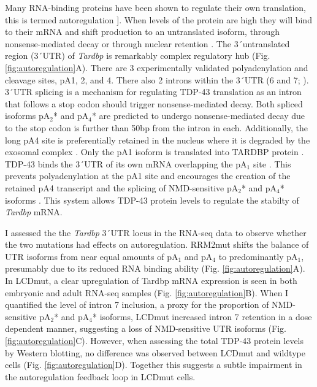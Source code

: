 Many RNA-binding proteins have been shown to regulate their own translation, this is termed autoregulation \citep{Lareau2007,Wollerton2004}]. 
When levels of the protein are high they will bind to their mRNA and shift production to an untranslated isoform, through nonsense-mediated decay or through nuclear retention \citep{McGlincy2008-wh,Boutz2015}.
The 3\'\ untranslated region (3\'\ UTR) of \textit{Tardbp} is remarkably complex regulatory hub (Fig. \ref{fig:autoregulation}A). 
There are 3 experimentally validated polyadenylation and cleavage sites, pA1, 2, and 4. 
There also 2 introns within the 3\'\ UTR (6 and 7; \citep{Ayala2011,Koyama2016}). 
3\'\ UTR splicing is a mechanism for regulating TDP-43 translation as an intron that follows a stop codon should trigger nonsense-mediated decay. 
Both spliced isoforms pA$_2$* and pA$_4$* are predicted to undergo nonsense-mediated decay due to the stop codon is further than 50bp from the intron in each.
Additionally, the long pA4 site is preferentially retained in the nucleus where it is degraded by the exosomal complex \citep{Ayala2011}.
Only the pA1 isoform is translated into TARDBP protein \citep{Koyama2016}.
TDP-43 binds the 3\'\ UTR of its own mRNA overlapping the pA$_1$ site  \citep{Polymenidou2011,Tollervey2011}.
This prevents polyadenylation at the pA1 site and encourages the creation of the retained pA4 transcript and the splicing of NMD-sensitive pA$_2$* and pA$_4$* isoforms \citep{Koyama2016}. 
This system allows TDP-43 protein levels to regulate the stabilty of \textit{Tardbp} mRNA.

I assessed the the \textit{Tardbp} 3\'\ UTR locus in the RNA-seq data to observe whether the two mutations had effects on autoregulation. 
RRM2mut shifts the balance of UTR isoforms from near equal amounts of pA$_1$ and pA$_4$ to predominantly pA$_1$, presumably due to its reduced RNA binding ability  (Fig. \ref{fig:autoregulation}A).  
In LCDmut, a clear upregulation of Tardbp mRNA expression is seen in both embryonic and adult RNA-seq samples (Fig. \ref{fig:autoregulation}B). 
When I quantified the level of intron 7 inclusion,  a proxy for the proportion of NMD-sensitive pA$_2$* and pA$_4$* isoforms, LCDmut increased intron 7 retention in a dose dependent manner, suggesting a loss of NMD-sensitive UTR isoforms (Fig. \ref{fig:autoregulation}C). 
However, when assessing the total TDP-43 protein levels by Western blotting, no difference was observed between LCDmut and wildtype cells (Fig. \ref{fig:autoregulation}D).
Together this suggests a subtle impairment in the autoregulation feedback loop in LCDmut cells.

